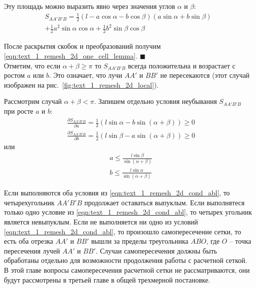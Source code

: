 Эту площадь можно выразить явно через значения углов $\alpha$ и $\beta$:
\begin{multline}\label{eqn:2dr_local_square_abalphabeta}
S_{AA'B'B} = \frac{1}{2}(l - a \cos \alpha - b \cos \beta)(a \sin \alpha + b \sin \beta) \\ + \frac{1}{2}a^2 \sin \alpha \cos \alpha + \frac{1}{2}b^2 \sin \beta \cos \beta
\end{multline}

После раскрытия скобок и преобразований получим \eqref{eqn:text_1_remesh_2d_one_cell_lemma}.
$\blacksquare$\\

Отметим, что если $\alpha + \beta \ge \pi$ то $S_{AA'B'B}$ всегда положительна и возрастает с ростом $a$ или $b$.
Это означает, что лучи $AA'$ и $BB'$ не пересекаются (этот случай изображен на рис.~\ref{fig:text_1_remesh_2d_local}).

Рассмотрим случай $\alpha + \beta < \pi$.
Запишем отдельно условия неубывания $S_{AA'B'B}$ при росте $a$ и $b$:
\begin{equation}
	\begin{aligned}
		& \frac{\partial S_{AA'B'B}}{\partial a} = \frac{1}{2}(l \sin \alpha - b \sin (\alpha + \beta)) \ge 0 \\
		& \frac{\partial S_{AA'B'B}}{\partial b} = \frac{1}{2}(l \sin \beta - a \sin (\alpha + \beta)) \ge 0
	\end{aligned}
\end{equation}
или
\begin{equation}\label{eqn:text_1_remesh_2d_cond_abl}
	\begin{aligned}
		& a \le \frac{l \sin \beta}{\sin (\alpha + \beta)} \\
		& b \le \frac{l \sin \alpha}{\sin (\alpha + \beta)}
	\end{aligned}
\end{equation}

Если выполняются оба условия из \eqref{eqn:text_1_remesh_2d_cond_abl}, то четырехугольник $AA'B'B$ продолжает оставаться выпуклым.
Если выполнятеся только одно условие из \eqref{eqn:text_1_remesh_2d_cond_abl}, то четырех угольник является невыпуклым.
Если не выполняется ни одно из условий \eqref{eqn:text_1_remesh_2d_cond_abl}, то произошло самопересечение сетки, то есть оба отрезка $AA'$ и $BB'$ вышли за пределы треугольника $ABO$, где $O$ -- точка пересечения лучей $AA'$ и $BB'$.
Случаи самопересечения должны быть обработаны отдельно для возможности продолжения работы с расчетной сеткой.
В этой главе вопросы самопересечения расчетной сетки не рассматриваются, они будут рассмотрены в третьей главе в общей трехмерной постановке.

